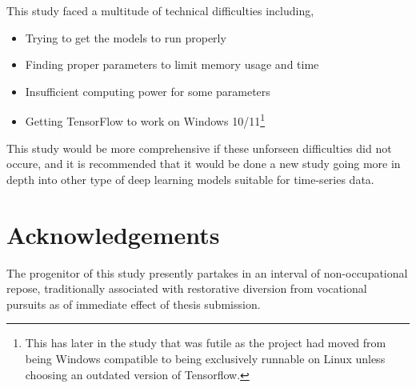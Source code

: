 This study faced a multitude of technical difficulties including,
\begin{itemize}
	\item Trying to get the models to run properly
	\item Finding proper parameters to limit memory usage and time
	\item Insufficient computing power for some parameters
	\item Getting TensorFlow to work on Windows 10/11\footnote{This has later in the study that was futile as the project had moved from being Windows compatible to being exclusively runnable on Linux unless choosing an outdated version of Tensorflow.}
\end{itemize}
This study would be more comprehensive if these unforseen difficulties did not occure, and it is recommended that it would be done a new study going more in depth into other type of deep learning models suitable for time-series data.


\section{Acknowledgements}
The progenitor of this study presently partakes in an interval of non-occupational repose, traditionally associated with restorative diversion from vocational pursuits as of immediate effect of thesis submission.
\label{pg:LastBread}